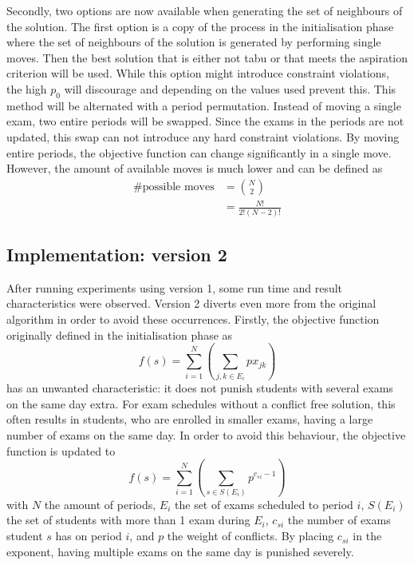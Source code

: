Secondly, two options are now available when generating the set of neighbours of the solution. The first option is a copy of the process in the initialisation phase where the set of neighbours of the solution is generated by performing single moves. Then the best solution that is either not tabu or that meets the aspiration criterion will be used. While this option might introduce constraint violations, the high $p_0$ will discourage and depending on the values used prevent this. This method will be alternated with a period permutation. Instead of moving a single exam, two entire periods will be swapped. Since the exams in the periods are not updated, this swap can not introduce any hard constraint violations. By moving entire periods, the objective function can change significantly in a single move. However, the amount of available moves is much lower and can be defined as
\begin{equation}
\begin{split}
   \text{\# possible moves}  & = \binom{N}{2}   \\
   & = \frac{N!}{2!(N-2)!}
\end{split}
\end{equation}

\subsection{Implementation: version 2}

After running experiments using version 1, some run time and result characteristics were observed. Version 2 diverts even more from the original algorithm in order to avoid these occurrences. Firstly, the objective function originally defined in the initialisation phase as   
\begin{equation}
    f(s) = \sum_{i=1}^{N} ( \sum_{j,k \in E_i}^{}p x_{jk})
\end{equation}
has an unwanted characteristic: it does not punish students with several exams on the same day extra. For exam schedules without a conflict free solution, this often results in students, who are enrolled in smaller exams, having a large number of exams on the same day. In order to avoid this behaviour, the objective function is updated to
\begin{equation}
    f(s) = \sum_{i=1}^{N} ( \sum_{s \in S(E_i)}^{}p^{c_{si} - 1})
\end{equation}
with $N$ the amount of periods, $E_i$ the set of exams scheduled to period $i$, $S(E_i)$ the set of students with more than 1 exam during $E_i$, $c_{si}$ the number of exams student $s$ has on period $i$, and $p$ the weight of conflicts. By placing $c_{si}$ in the exponent, having multiple exams on the same day is punished severely. 

